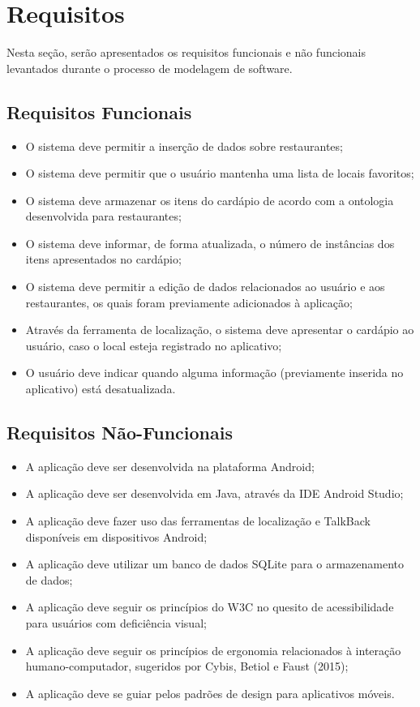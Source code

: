\chapter{\label{chap:requi}Requisitos}
Nesta seção, serão apresentados os requisitos funcionais e não funcionais levantados durante o processo de modelagem de software.

\section{Requisitos Funcionais}
\begin{itemize}
    \item O sistema deve permitir a inserção de dados sobre restaurantes;
    \item O sistema deve permitir que o usuário mantenha uma lista de locais favoritos;
    \item O sistema deve armazenar os itens do cardápio de acordo com a ontologia desenvolvida para restaurantes;
    \item O sistema deve informar, de forma atualizada, o número de instâncias dos itens apresentados no cardápio;
    \item O sistema deve permitir a edição de dados relacionados ao usuário e aos restaurantes, os quais foram previamente adicionados à aplicação;
    \item Através da ferramenta de localização, o sistema deve apresentar o cardápio ao usuário, caso o local esteja registrado no aplicativo;
    \item O usuário deve indicar quando alguma informação (previamente inserida no aplicativo) está desatualizada.
\end{itemize}

\section{Requisitos Não-Funcionais}
\begin{itemize}
    \item A aplicação deve ser desenvolvida na plataforma Android;
    \item A aplicação deve ser desenvolvida em Java, através da IDE Android Studio;
    \item A aplicação deve fazer uso das ferramentas de localização e TalkBack disponíveis em dispositivos Android;
    \item A aplicação deve utilizar um banco de dados SQLite para o armazenamento de dados;
    \item A aplicação deve seguir os princípios do W3C no quesito de acessibilidade para usuários com deficiência visual;
    \item A aplicação deve seguir os princípios de ergonomia relacionados à interação humano-computador, sugeridos por Cybis, Betiol e Faust (2015);
    \item A aplicação deve se guiar pelos padrões de design para aplicativos móveis.
\end{itemize}